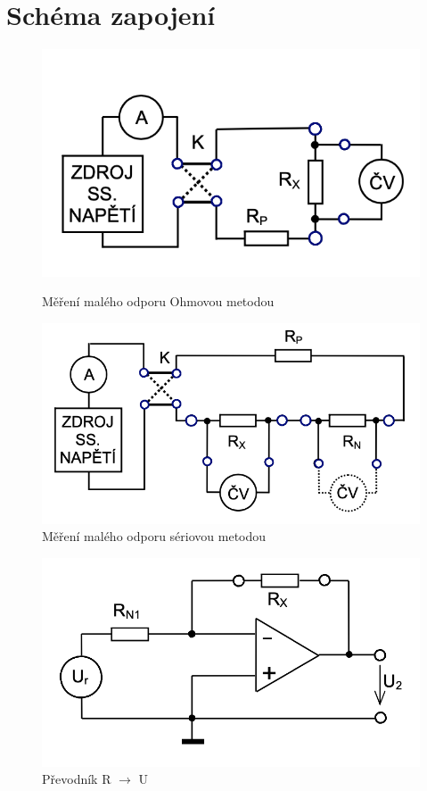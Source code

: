 \documentclass[a4paper,12pt]{article}   %
\begin{document}
\section{Schéma zapojení}
\label{chap:schema_zapojeni}
\begin{figure}[h!]
  \centering
  \begin{minipage}{.4\textwidth}
    \centering
    \captionsetup{width=0.8\textwidth}
    \includegraphics[width=\textwidth]{ohm.png}
    \caption{Měření malého odporu Ohmovou metodou}
    \label{fig:ohm}
  \end{minipage}
  \begin{minipage}{.4\textwidth}
    \centering
    \captionsetup{width=0.8\textwidth}
    \includegraphics[width=\textwidth]{ser.png}
    \caption{Měření malého odporu sériovou metodou}
    \label{fig:ser}
  \end{minipage}
\end{figure}

\begin{figure}
  \centering
  \includegraphics[width=.4\textwidth]{ru.png}
  \caption{Převodník R $\rightarrow$ U}
\end{figure}
\end{document}
